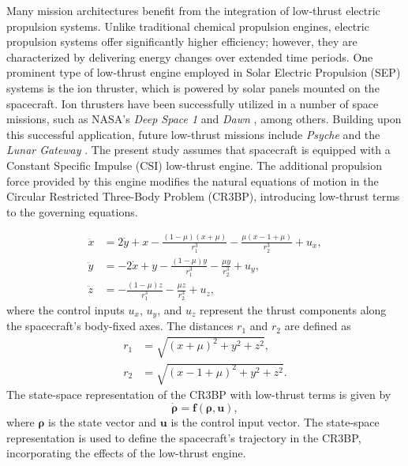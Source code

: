 \documentclass[conference]{IEEEtran}
\begin{document}
Many mission architectures benefit from the integration of low-thrust electric propulsion systems. Unlike traditional chemical propulsion engines, electric propulsion systems offer significantly higher efficiency; however, they are characterized by delivering energy changes over extended time periods. One prominent type of low-thrust engine employed in Solar Electric Propulsion (SEP) systems is the ion thruster, which is powered by solar panels mounted on the spacecraft. Ion thrusters have been successfully utilized in a number of space missions, such as NASA's \textit{Deep Space 1} \cite{DeepSpace1} and \textit{Dawn} \cite{Dawn}, among others. Building upon this successful application, future low-thrust missions include \textit{Psyche} \cite{Psyche} and the \textit{Lunar Gateway} \cite{LunarGateway}. The present study assumes that spacecraft is equipped with a Constant Specific Impulse (CSI) low-thrust engine. The additional propulsion force provided by this engine modifies the natural equations of motion in the Circular Restricted Three-Body Problem (CR3BP), introducing low-thrust terms to the governing equations.

\begin{align}
		\ddot{x} &= 2\dot{y} + x - \frac{(1-\mu)(x+\mu)}{r_1^3} - \frac{\mu(x-1+\mu)}{r_2^3} + u_x, \\
		\ddot{y} &= -2\dot{x} + y - \frac{(1-\mu)y}{r_1^3} - \frac{\mu y}{r_2^3} + u_y, \\
		\ddot{z} &= -\frac{(1-\mu)z}{r_1^3} - \frac{\mu z}{r_2^3} + u_z,
\end{align}
where the control inputs \( u_x \), \( u_y \), and \( u_z \) represent the thrust components along the spacecraft's body-fixed axes. The distances \( r_1 \) and \( r_2 \) are defined as 
\begin{align}
	r_1 &= \sqrt{(x+\mu)^2 + y^2 + z^2}, \\
	r_2 &= \sqrt{(x-1+\mu)^2 + y^2 + z^2}.
\end{align}
The state-space representation of the CR3BP with low-thrust terms is given by
\begin{equation}
	\dot{\boldsymbol{\rho}} = \boldsymbol{f}(\boldsymbol{\rho}, \boldsymbol{u}),
\end{equation}
where \( \boldsymbol{\rho} \) is the state vector and \( \boldsymbol{u} \) is the control input vector. The state-space representation is used to define the spacecraft's trajectory in the CR3BP, incorporating the effects of the low-thrust engine.
\end{document}
